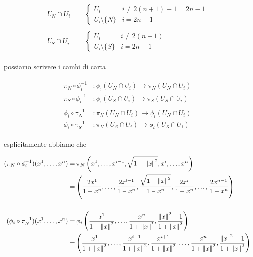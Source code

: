 \begin{align}
	\begin{split}
		U_{N} \cap U_{i} &= %
		\begin{cases}
			U_{i} & i \neq 2(n+1)-1 = 2n-1\\
			U_{i} \setminus \{ N \} & i = 2n-1
		\end{cases}\\\\
		U_{S} \cap U_{i} &= %
		\begin{cases}
			U_{i} & i \neq 2(n+1)\\
			U_{i} \setminus \{ S \} & i = 2n+1
		\end{cases}
	\end{split}
\end{align}

possiamo scrivere i cambi di carta

\begin{align}
	\begin{split}
		\pi_{N} \circ \phi_{i}^{-1} &: \phi_{i}(U_{N} \cap U_{i}) \to \pi_{N}(U_{N} \cap U_{i})\\
		\pi_{S} \circ \phi_{i}^{-1} &: \phi_{i}(U_{S} \cap U_{i}) \to \pi_{S}(U_{S} \cap U_{i})\\\\
		\phi_{i} \circ \pi_{N}^{-1} &: \pi_{N}(U_{N} \cap U_{i}) \to \phi_{i}(U_{N} \cap U_{i})\\
		\phi_{i} \circ \pi_{S}^{-1} &: \pi_{N}(U_{S} \cap U_{i}) \to \phi_{i}(U_{S} \cap U_{i})
	\end{split}
\end{align}

esplicitamente abbiamo che

\begin{align}
	\begin{split}
		(\pi_{N} \circ \phi_{i}^{-1})(x^{1},\dots,x^{n}) &= \pi_{N} \left( x^{1}, \dots, x^{i-1}, \sqrt{1 - \norm{x}^{2}}, x^{i}, \dots, x^{n} \right)\\
		&= \left( \dfrac{2 x^{1}}{1-x^{n}}, \dots, \dfrac{2 x^{i-1}}{1-x^{n}}, \dfrac{\sqrt{1 - \norm{x}^{2}}}{1-x^{n}}, \dfrac{2 x^{i}}{1-x^{n}}, \dots, \dfrac{2 x^{n-1}}{1-x^{n}} \right)\\\\
		(\phi_{i} \circ \pi_{N}^{-1})(x^{1},\dots,x^{n}) &= \phi_{i} \left( \dfrac{x^{1}}{1 + \norm{x}^{2}}, \dots, \dfrac{x^{n}}{1 + \norm{x}^{2}}, \dfrac{\norm{x}^{2} - 1}{1 + \norm{x}^{2}} \right)\\
		&= \left( \dfrac{x^{1}}{1 + \norm{x}^{2}}, \dots, \dfrac{x^{i-1}}{1 + \norm{x}^{2}}, \dfrac{x^{i+1}}{1 + \norm{x}^{2}}, \dots, \dfrac{x^{n}}{1 + \norm{x}^{2}}, \dfrac{\norm{x}^{2} - 1}{1 + \norm{x}^{2}} \right)
	\end{split}
\end{align}

